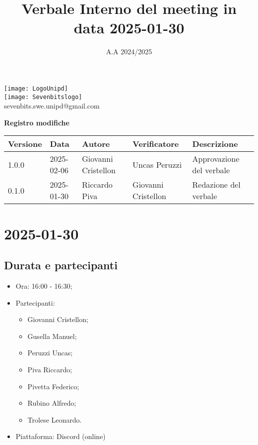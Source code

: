 \documentclass[10pt]{article}
\title{Verbale Interno del meeting in data 2025-01-30}
\date{A.A 2024/2025}
\begin{document}
\maketitle
\begin{center}
\texttt{[image: LogoUnipd]}\\
\texttt{[image: Sevenbitslogo]}\\
sevenbits.swe.unipd@gmail.com\\
\vspace{2mm}

\textbf{Registro modifiche}\\
\vspace{2mm}
\begin{tabularx}{\textwidth}{|l|l|l|l|X|}
\hline
\textbf{Versione} & \textbf{Data} & \textbf{Autore} & \textbf{Verificatore} & \textbf{Descrizione} \\
\hline
1.0.0 & 2025-02-06 & Giovanni Cristellon & Uncas Peruzzi& Approvazione del verbale \\
\hline
0.1.0 & 2025-01-30 & Riccardo Piva & Giovanni Cristellon & Redazione del verbale \\
\hline
\end{tabularx}
\end{center}

\newpage
\tableofcontents
\newpage
\section{2025-01-30}
\subsection{Durata e partecipanti}
\begin{itemize}
\item Ora: 16:00 - 16:30;
\item Partecipanti:
	\begin{itemize}
    	\item Giovanni Cristellon;
		\item Gusella Manuel;
		\item Peruzzi Uncas;
		\item Piva Riccardo;
		\item Pivetta Federico;
		\item Rubino Alfredo;
		\item Trolese Leonardo.
	\end{itemize}
\item Piattaforma: Discord (online)
\end{itemize}
\end{document}
